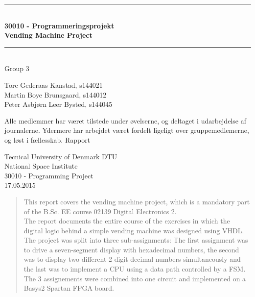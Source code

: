 \begin{titlepage}

\centering \parindent=0pt
\newcommand{\HRule}{\rule{\textwidth}{1mm}}
 \HRule\\[0.7cm]\Huge\bfseries
30010 - Programmeringsprojekt \\[0.7cm] %
Vending Machine Project\\ %
\HRule\\[2cm]  
\Large
Group 3
\\
\large

Tore Gederaas Kanstad, s144021 \\

Martin Boye Brunsgaard, s144012	\\

Peter Asbjørn Leer Bysted, s144045 \\

 \normalsize

Alle medlemmer har været tilstede under øvelserne, og deltaget i udarbejdelse af journalerne. Ydermere har arbejdet været fordelt ligeligt over gruppemedlemerne, og løst i fællesskab. Rapport
\begin{flushleft}
Tecnical University of Denmark DTU\\ %
National Space Institute\\ 
30010 - Programming Project\\ %
17.05.2015 %
\end{flushleft}
\end{titlepage}
\newpage
\renewcommand{\abstractname}{Abstract}
\begin{abstract}

This report covers the vending machine project, which is a mandatory part of the B.Sc. EE course 02139 Digital Electronics 2.\\ The report documents the entire course of the exercises in which the digital logic behind a simple vending machine was designed using VHDL. The project was split into three sub-assignments: The first assignment was to drive a seven-segment display with hexadecimal numbers, the second was to display two different 2-digit decimal numbers simultaneously  and the last was to implement a CPU using a data path controlled by a FSM. The 3 assignements were combined into one circuit and implemented on a Basys2 Spartan FPGA board.
\end{abstract}
\newpage
\tableofcontents


\newpage